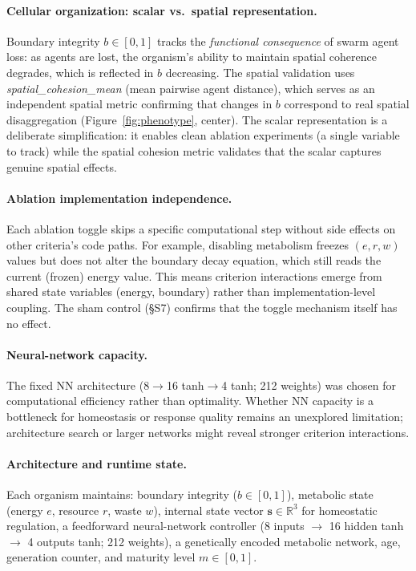 \documentclass[letterpaper]{article}
\begin{document}
\paragraph{Cellular organization: scalar vs.\ spatial representation.}
Boundary integrity $b \in [0,1]$ tracks the \emph{functional consequence}
of swarm agent loss: as agents are lost, the organism's ability to maintain
spatial coherence degrades, which is reflected in $b$ decreasing.
The spatial validation uses \emph{spatial\_cohesion\_mean} (mean pairwise
agent distance), which serves as an independent spatial metric confirming
that changes in $b$ correspond to real spatial disaggregation
(Figure~\ref{fig:phenotype}, center).
The scalar representation is a deliberate simplification: it enables
clean ablation experiments (a single variable to track) while the spatial
cohesion metric validates that the scalar captures genuine spatial effects.

\paragraph{Ablation implementation independence.}
Each ablation toggle skips a specific computational step without side
effects on other criteria's code paths. For example, disabling metabolism
freezes $(e, r, w)$ values but does not alter the boundary decay equation,
which still reads the current (frozen) energy value. This means
criterion interactions emerge from shared state variables (energy, boundary)
rather than implementation-level coupling. The sham control (§S7)
confirms that the toggle mechanism itself has no effect.

\paragraph{Neural-network capacity.}
The fixed NN architecture (8$\to$16 tanh$\to$4 tanh; 212 weights)
was chosen for computational efficiency rather than optimality.
Whether NN capacity is a bottleneck for homeostasis or response quality
remains an unexplored limitation; architecture search or larger networks
might reveal stronger criterion interactions.

\paragraph{Architecture and runtime state.}
Each organism maintains: boundary integrity ($b \in [0,1]$), metabolic state
(energy $e$, resource $r$, waste $w$), internal state vector
$\mathbf{s} \in \mathbb{R}^3$ for homeostatic regulation, a feedforward
neural-network controller (8 inputs $\to$ 16 hidden tanh $\to$ 4 outputs tanh;
212 weights), a genetically encoded metabolic network, age, generation counter,
and maturity level $m \in [0,1]$.
\end{document}

